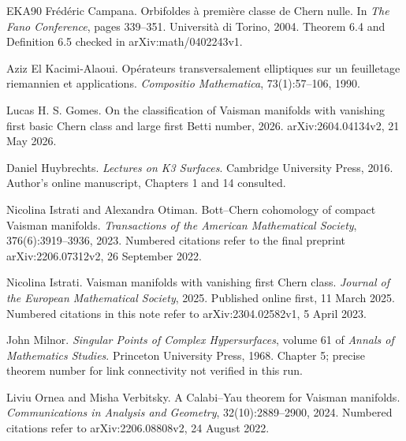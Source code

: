 \documentclass[12pt]{amsart}
\theoremstyle{definition}
\theoremstyle{remark}
\numberwithin{equation}{section}
\begin{document}
\clearpage
\begin{thebibliography}{EKA90}
Frédéric Campana. Orbifoldes à première classe de Chern nulle. In \emph{The Fano Conference}, pages 339--351. Università di Torino, 2004. Theorem 6.4 and Definition 6.5 checked in arXiv:math/0402243v1.

Aziz El Kacimi-Alaoui. Opérateurs transversalement elliptiques sur un feuilletage riemannien et applications. \emph{Compositio Mathematica}, 73(1):57--106, 1990.

Lucas H. S. Gomes. On the classification of Vaisman manifolds with vanishing first basic Chern class and large first Betti number, 2026. arXiv:2604.04134v2, 21 May 2026.

Daniel Huybrechts. \emph{Lectures on K3 Surfaces}. Cambridge University Press, 2016. Author's online manuscript, Chapters 1 and 14 consulted.

Nicolina Istrati and Alexandra Otiman. Bott--Chern cohomology of compact Vaisman manifolds. \emph{Transactions of the American Mathematical Society}, 376(6):3919--3936, 2023. Numbered citations refer to the final preprint arXiv:2206.07312v2, 26 September 2022.

Nicolina Istrati. Vaisman manifolds with vanishing first Chern class. \emph{Journal of the European Mathematical Society}, 2025. Published online first, 11 March 2025. Numbered citations in this note refer to arXiv:2304.02582v1, 5 April 2023.

John Milnor. \emph{Singular Points of Complex Hypersurfaces}, volume 61 of \emph{Annals of Mathematics Studies}. Princeton University Press, 1968. Chapter 5; precise theorem number for link connectivity not verified in this run.

Liviu Ornea and Misha Verbitsky. A Calabi--Yau theorem for Vaisman manifolds. \emph{Communications in Analysis and Geometry}, 32(10):2889--2900, 2024. Numbered citations refer to arXiv:2206.08808v2, 24 August 2022.

\end{thebibliography}



\clearpage
\endgroup
\end{document}
